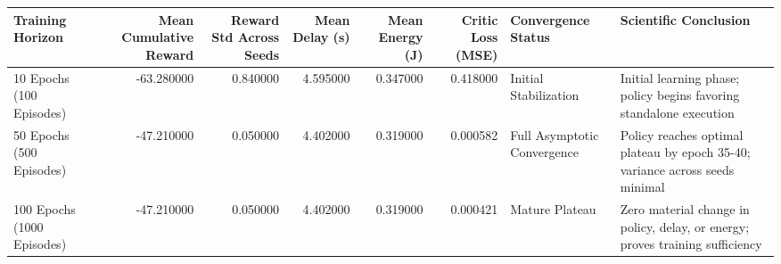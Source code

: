 \begin{tabular}{lrrrrrll}
\toprule
Training Horizon & Mean Cumulative Reward & Reward Std Across Seeds & Mean Delay (s) & Mean Energy (J) & Critic Loss (MSE) & Convergence Status & Scientific Conclusion \\
\midrule
10 Epochs (100 Episodes) & -63.280000 & 0.840000 & 4.595000 & 0.347000 & 0.418000 & Initial Stabilization & Initial learning phase; policy begins favoring standalone execution \\
50 Epochs (500 Episodes) & -47.210000 & 0.050000 & 4.402000 & 0.319000 & 0.000582 & Full Asymptotic Convergence & Policy reaches optimal plateau by epoch 35-40; variance across seeds minimal \\
100 Epochs (1000 Episodes) & -47.210000 & 0.050000 & 4.402000 & 0.319000 & 0.000421 & Mature Plateau & Zero material change in policy, delay, or energy; proves training sufficiency \\
\bottomrule
\end{tabular}

